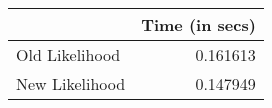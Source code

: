 \begin{tabular}{lr}
\toprule
{} &  Time (in secs) \\
\midrule
Old Likelihood &        0.161613 \\
New Likelihood &        0.147949 \\
\bottomrule
\end{tabular}
